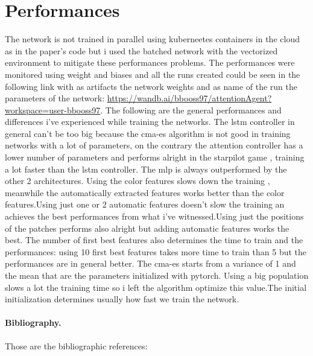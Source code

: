 \documentclass{article}
\begin{document}
\section{Performances}
The network is not trained in parallel using kuberneetes containers in the cloud as in the paper's code but i used the batched network with the vectorized environment to mitigate these performances problems.
The performances were monitored using weight and biases and all the runs created could be seen in the following link with as artifacts the network weights and as name of the run the parameters of the network: \url{https://wandb.ai/bbooss97/attentionAgent?workspace=user-bbooss97}.
The following are the general performances and differences i've experienced while training the networks.
The lstm controller in general can't be too big because the cma-es algorithm is not good in training networks with a lot of parameters, on the contrary the attention controller has a lower number of parameters and performs alright in the starpilot game , training a lot faster than the lstm controller.
The mlp is always outperformed by the other 2 architectures.
Using the color features slows down the training , meanwhile the automatically extracted features works better than the color features.Using just one or 2 automatic features doesn't slow the training an achieves the best performances from what i've witnessed.Using just the positions of the patches performs also alright but adding automatic features works the best.
The number of first best features also determines the time to train and the performances: using 10 first best features takes more time to train than 5 but the performances are in general better.
The cma-es starts from a variance of 1 and the mean that are the parameters initialized with pytorch.
Using a big population slows a lot the training time so i left the algorithm optimize this value.The initial initialization determines usually how fast we train the network.





















\paragraph*{Bibliography.}
Those are the bibliographic references:





\end{document}
